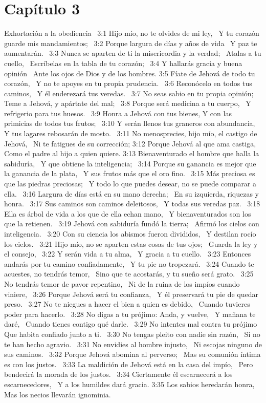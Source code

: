 \section*{Capítulo 3 }
Exhortación a la obediencia  
3:1 Hijo mío, no te olvides de mi ley,  
Y tu corazón guarde mis mandamientos;  
3:2 Porque largura de días y años de vida  
Y paz te aumentarán.  
3:3 Nunca se aparten de ti la misericordia y la verdad;  
Atalas a tu cuello,  
Escríbelas en la tabla de tu corazón;  
3:4 Y hallarás gracia y buena opinión  
Ante los ojos de Dios y de los hombres. 
3:5 Fíate de Jehová de todo tu corazón,  
Y no te apoyes en tu propia prudencia.  
3:6 Reconócelo en todos tus caminos,  
Y él enderezará tus veredas.  
3:7 No seas sabio en tu propia opinión; 
Teme a Jehová, y apártate del mal;  
3:8 Porque será medicina a tu cuerpo,  
Y refrigerio para tus huesos.  
3:9 Honra a Jehová con tus bienes, 
Y con las primicias de todos tus frutos;  
3:10 Y serán llenos tus graneros con abundancia,  
Y tus lagares rebosarán de mosto.  
3:11 No menosprecies, hijo mío, el castigo de Jehová,  
Ni te fatigues de su corrección; 
3:12 Porque Jehová al que ama castiga, 
Como el padre al hijo a quien quiere. 
3:13 Bienaventurado el hombre que halla la sabiduría,  
Y que obtiene la inteligencia;  
3:14 Porque su ganancia es mejor que la ganancia de la plata,  
Y sus frutos más que el oro fino.  
3:15 Más preciosa es que las piedras preciosas;  
Y todo lo que puedes desear, no se puede comparar a ella.  
3:16 Largura de días está en su mano derecha;  
En su izquierda, riquezas y honra.  
3:17 Sus caminos son caminos deleitosos,  
Y todas sus veredas paz.  
3:18 Ella es árbol de vida a los que de ella echan mano,  
Y bienaventurados son los que la retienen.  
3:19 Jehová con sabiduría fundó la tierra;  
Afirmó los cielos con inteligencia.  
3:20 Con su ciencia los abismos fueron divididos,  
Y destilan rocío los cielos.  
3:21 Hijo mío, no se aparten estas cosas de tus ojos;  
Guarda la ley y el consejo,  
3:22 Y serán vida a tu alma,  
Y gracia a tu cuello.  
3:23 Entonces andarás por tu camino confiadamente,  
Y tu pie no tropezará.  
3:24 Cuando te acuestes, no tendrás temor,  
Sino que te acostarás, y tu sueño será grato.  
3:25 No tendrás temor de pavor repentino,  
Ni de la ruina de los impíos cuando viniere,  
3:26 Porque Jehová será tu confianza,  
Y él preservará tu pie de quedar preso.  
3:27 No te niegues a hacer el bien a quien es debido,  
Cuando tuvieres poder para hacerlo.  
3:28 No digas a tu prójimo: Anda, y vuelve,  
Y mañana te daré,  
Cuando tienes contigo qué darle.  
3:29 No intentes mal contra tu prójimo  
Que habita confiado junto a ti.  
3:30 No tengas pleito con nadie sin razón,  
Si no te han hecho agravio.  
3:31 No envidies al hombre injusto,  
Ni escojas ninguno de sus caminos.  
3:32 Porque Jehová abomina al perverso;  
Mas su comunión íntima es con los justos.  
3:33 La maldición de Jehová está en la casa del impío,  
Pero bendecirá la morada de los justos.  
3:34 Ciertamente él escarnecerá a los escarnecedores,  
Y a los humildes dará gracia. 
3:35 Los sabios heredarán honra,  
Mas los necios llevarán ignominia.  
